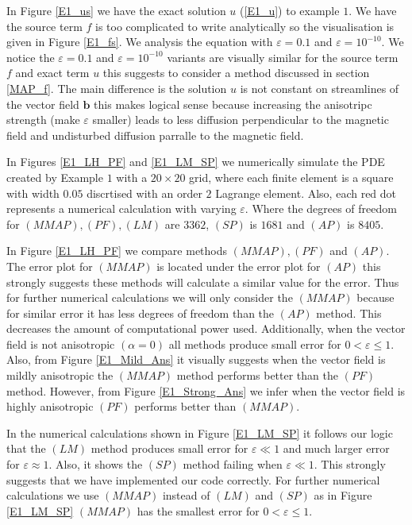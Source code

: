 \documentclass[12pt]{ociamthesis}
\begin{document}
In Figure \ref{E1_us} we have the exact solution $u$ (\ref{E1_u}) to example $1$. We have the source term $f$ is too complicated to write analytically so the visualisation is given in Figure \ref{E1_fs}. We analysis the equation with $\varepsilon = 0.1$ and $\varepsilon = 10^{-10}$. We notice the $\varepsilon = 0.1$ and $\varepsilon = 10^{-10}$ variants are visually similar for the source term $f$ and exact term $u$ this suggests to consider a method discussed in section \ref{MAP_f}. The main difference is the solution $u$ is not constant on streamlines of the vector field $\mathbf{b}$ this makes logical sense because increasing the anisotripc strength (make $\varepsilon$ smaller) leads to less diffusion perpendicular to the magnetic field and undisturbed diffusion parralle to the magnetic field.

In Figures \ref{E1_LH_PF} and \ref{E1_LM_SP} we numerically simulate the PDE created by Example $1$ with a $20 \times 20$ grid, where each finite element is a square with width $0.05$ discrtised with an order $2$ Lagrange element. Also, each red dot represents a numerical calculation with varying $\varepsilon$. Where the degrees of freedom for $(MMAP), (PF), (LM)$ are $3362$, $(SP)$ is $1681$ and $(AP)$ is $8405$.

In Figure \ref{E1_LH_PF} we compare methods $(MMAP), (PF)$ and $(AP)$. The error plot for $(MMAP)$ is located under the error plot for $(AP)$ this strongly suggests these methods will calculate a similar value for the error. Thus for further numerical calculations we will only consider the $(MMAP)$ because for similar error it has less degrees of freedom than the $(AP)$ method. This decreases the amount of computational power used. Additionally, when the vector field is not anisotropic $(\alpha = 0)$ all methods produce small error for $0 <\varepsilon \leq 1$. Also, from Figure \ref{E1_Mild_Ans} it visually suggests when the vector field is mildly anisotropic the $(MMAP)$ method performs better than the $(PF)$ method. However, from Figure \ref{E1_Strong_Ans} we infer when the vector field is highly anisotropic $(PF)$ performs better than $(MMAP)$. 

In the numerical calculations shown in Figure \ref{E1_LM_SP} it follows our logic that the $(LM)$ method produces small error for $\varepsilon \ll 1$ and much larger error for $\varepsilon \approx 1$. Also, it shows the $(SP)$ method failing when $\varepsilon \ll 1$. This strongly suggests that we have implemented our code correctly. For further numerical calculations we use $(MMAP)$ instead of $(LM)$ and $(SP)$ as in Figure \ref{E1_LM_SP} $(MMAP)$ has the smallest error for  $0 < \varepsilon \leq 1$.
\end{document}

